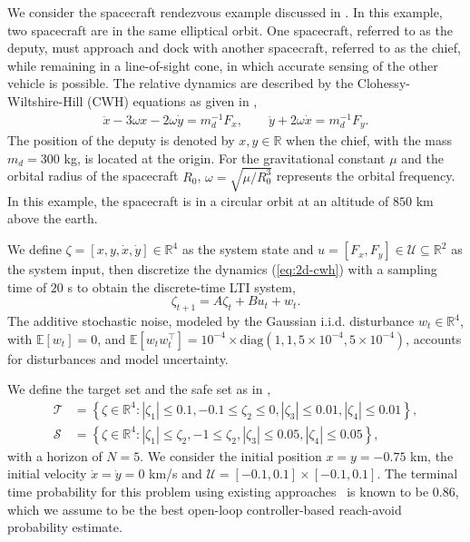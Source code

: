 \documentclass[11pt,letterpaper]{article}
\begin{document}
We consider the spacecraft rendezvous example discussed in \cite{lesser2013stochastic}. In this example, two spacecraft are in the same elliptical orbit. One spacecraft, referred to as the deputy, must approach and dock with another spacecraft, referred to as the chief, while remaining in a line-of-sight cone, in which accurate sensing of the other vehicle is possible.  The relative dynamics are described by the Clohessy-Wiltshire-Hill (CWH) equations as given in \cite{wiesel1989spaceflight}, 
\begin{align}
    \ddot{x} - 3 \omega x - 2 \omega \dot{y} = m_{d}^{-1}F_{x},\qquad\ddot{y} + 2 \omega \dot{x} = m_{d}^{-1}F_{y}.
  \label{eq:2d-cwh}
\end{align}
The position of the deputy is denoted by $x,y \in \mathbb{R}$ when the chief, with the mass $m_d=300$ kg, is located at the origin. For the gravitational constant $\mu$ and the orbital radius of the spacecraft $R_{0}$, $\omega = \sqrt{\mu/R_{0}^{3}}$ represents the orbital frequency. In this example, the spacecraft is in a circular orbit at an altitude of $850$ km above the earth. 


We define $\zeta = [x,y,\dot{x},\dot{y}] \in \mathbb{R}^{4}$ as the system state and $u = [F_{x},F_{y}] \in \mathcal{U}\subseteq\mathbb{R}^{2}$ as the system input, then discretize the dynamics (\ref{eq:2d-cwh}) with a sampling time of $20$ s to obtain the discrete-time LTI system,
\begin{equation}
  \zeta_{t+1} = A \zeta_{t} + B u_{t} + w_{t}.
 \label{eq:lin-cwh}
\end{equation}
The additive stochastic noise, modeled by the Gaussian i.i.d. disturbance $w_{t} \in \mathbb{R}^{4}$, with $\mathbb{E}[w_{t}] = 0$, and $\mathbb{E}[w_{t}w_{t}^\top] = 10^{-4}\times\mbox{diag}(1, 1, 5 \times 10^{-4}, 5 \times 10^{-4})$, accounts for disturbances and model uncertainty.

We define the target set and the safe set as in \cite{lesser2013stochastic},
\begin{align}
  \mathcal{T} &= \left\{ \zeta \in \mathbb{R}^{4}: |\zeta_{1}| \leq 0.1, -0.1 \leq \zeta_{2} \leq 0, |\zeta_{3}| \leq 0.01, |\zeta_{4}| \leq 0.01 \right\}, \\
  \mathcal{S} &= \left\{\zeta \in \mathbb{R}^{4}: |\zeta_{1}| \leq \zeta_{2},
  -1\leq \zeta_{2}, |\zeta_{3}| \leq 0.05, |\zeta_{4}| \leq 0.05 \right\},
\end{align}
with a horizon of $N = 5$. We consider the initial position $x=y=-0.75$ km, the initial velocity $\dot{x}=\dot{y}=0$ km/s and $\mathcal{U} = [-0.1, 0.1]\times [-0.1, 0.1]$. The terminal time probability for this problem using existing approaches~\cite{VinodLCSS2017, lesser2013stochastic} is known to be $0.86$, which we assume to be the best open-loop controller-based reach-avoid probability estimate.
\end{document}
